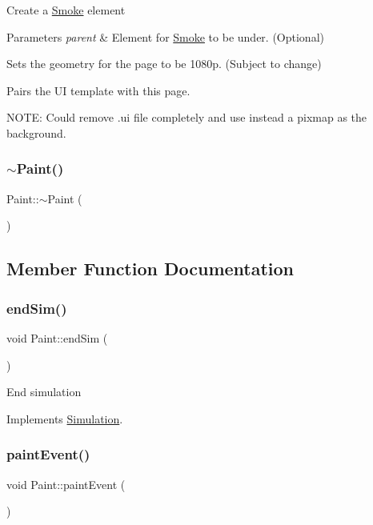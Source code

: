 Create a \mbox{\hyperlink{classSmoke}{Smoke}} element 
\begin{DoxyParams}{Parameters}
{\em parent} & Element for \mbox{\hyperlink{classSmoke}{Smoke}} to be under. (Optional)\\
\hline
\end{DoxyParams}
Sets the geometry for the page to be 1080p. (Subject to change)

Pairs the UI template with this page.

N\+O\+TE\+: Could remove .ui file completely and use instead a pixmap as the background. \mbox{\label{classPaint_ad9e9b7084b28e84887c70d0e4540ddb8}} 
\subsubsection{\texorpdfstring{$\sim$Paint()}{~Paint()}}
{\footnotesize\ttfamily Paint\+::$\sim$\+Paint (\begin{DoxyParamCaption}{ }\end{DoxyParamCaption})}



\subsection{Member Function Documentation}
\mbox{\label{classPaint_a0624eaeb1d076ab01278b27026aba249}} 
\subsubsection{\texorpdfstring{endSim()}{endSim()}}
{\footnotesize\ttfamily void Paint\+::end\+Sim (\begin{DoxyParamCaption}{ }\end{DoxyParamCaption})\hspace{0.3cm}{\ttfamily [virtual]}}

End simulation 

Implements \mbox{\hyperlink{classSimulation_ab496d124202f55e741db7db9a304a7ee}{Simulation}}.

\mbox{\label{classPaint_a93538df552b492f35b5349c9c546707f}} 
\subsubsection{\texorpdfstring{paintEvent()}{paintEvent()}}
{\footnotesize\ttfamily void Paint\+::paint\+Event (\begin{DoxyParamCaption}\item[{Q\+Paint\+Event $\ast$}]{ }\end{DoxyParamCaption})}

